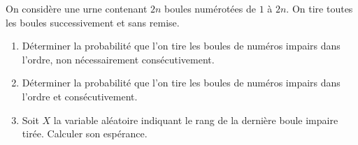 \begin{enonce}
\begin{exercise}[ID={RMS127 E764},subtitle={Mines-Ponts PSI 2016},tags={}, difficulty={0}]
On considère une urne contenant $2n$ boules numérotées de $1$ à $2n$.
On tire toutes les boules successivement et sans remise.
\begin{enumerate}
  \item 
    Déterminer la probabilité que l'on tire les boules de numéros impairs dans l'ordre, non nécessairement consécutivement.

  \item 
    Déterminer la probabilité que l'on tire les boules de numéros impairs dans l'ordre et consécutivement.

  \item
    Soit $X$ la variable aléatoire indiquant le rang de la dernière boule impaire tirée.
    Calculer son espérance.  
\end{enumerate}
\end{exercise}
\begin{solution}
\end{solution}
\end{enonce}
